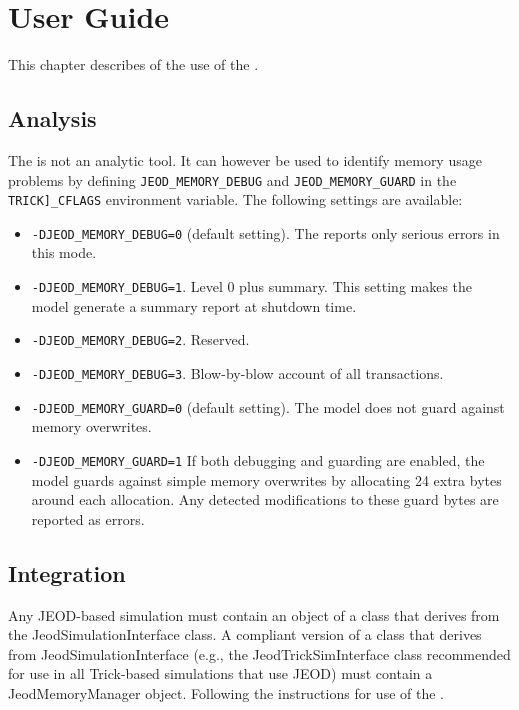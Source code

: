 %
%

\chapter{User Guide}
\label{ch:overview:user}

This chapter describes of the use of the \ModelDesc.

\section{Analysis}
The \ModelDesc is not an analytic tool. It can however be used to identify
memory usage problems by defining {\tt JEOD\_MEMORY\_DEBUG} and
{\tt JEOD\_MEMORY\_GUARD} in the {\tt TRICK]\_CFLAGS} environment variable.
The following settings are available:
\begin{itemize}
\item {\tt -DJEOD\_MEMORY\_DEBUG=0} (default setting).
  The \ModelDesc reports only serious errors in this mode.
\item {\tt -DJEOD\_MEMORY\_DEBUG=1}. Level 0 plus summary.
  This setting makes the model generate a summary report at shutdown time.
\item {\tt -DJEOD\_MEMORY\_DEBUG=2}. Reserved.
\item {\tt -DJEOD\_MEMORY\_DEBUG=3}. Blow-by-blow account of all transactions.
\item {\tt -DJEOD\_MEMORY\_GUARD=0} (default setting).
  The model does not guard against memory overwrites.
\item {\tt -DJEOD\_MEMORY\_GUARD=1}
  If both debugging and guarding are enabled, the model guards against simple
  memory overwrites by allocating 24 extra bytes around each allocation.
  Any detected modifications to these guard bytes are reported as errors.
\end{itemize}

\section{Integration}
Any JEOD-based simulation must contain an object of a class that derives from
the JeodSimulationInterface class. A compliant version of a class that derives
from JeodSimulationInterface (e.g., the JeodTrickSimInterface class recommended
for use in all Trick-based simulations that use JEOD)
must contain a JeodMemoryManager object.
Following the instructions for use of the .

